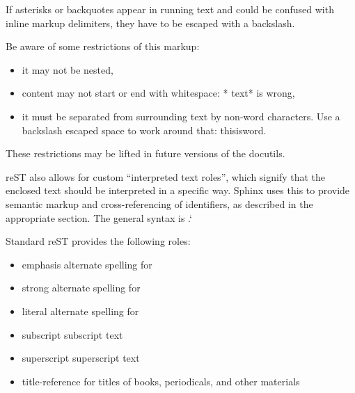 \documentclass[letterpaper,10pt,english]{sphinxmanual}
\begin{document}
If asterisks or backquotes appear in running text and could be confused with inline markup delimiters,
they have to be escaped with a backslash.

Be aware of some restrictions of this markup:
\begin{itemize}
\item {} 
it may not be nested,

\item {} 
content may not start or end with whitespace: * text* is wrong,

\item {} 
it must be separated from surrounding text by non-word characters.
Use a backslash escaped space to work around that: thisisword.

\end{itemize}

These restrictions may be lifted in future versions of the docutils.

reST also allows for custom “interpreted text roles”,
which signify that the enclosed text should be interpreted in a specific way.
Sphinx uses this to provide semantic markup and cross-referencing of identifiers,
as described in the appropriate section.
The general syntax is .{}`

Standard reST provides the following roles:
\begin{itemize}
\item {} 
emphasis \textendash{} alternate spelling for 

\item {} 
strong \textendash{} alternate spelling for 

\item {} 
literal \textendash{} alternate spelling for 

\item {} 
subscript \textendash{} subscript text

\item {} 
superscript \textendash{} superscript text

\item {} 
title-reference \textendash{} for titles of books, periodicals, and other materials

\end{itemize}
\end{document}
